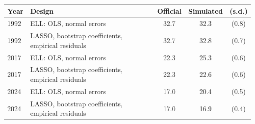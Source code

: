 \begin{tabular}{llccc}
\toprule
Year & Design & Official & Simulated & (s.d.) \\
\midrule
1992 & ELL: OLS, normal errors & 32.7 & 32.3 & (0.8) \\
1992 & LASSO, bootstrap coefficients, empirical residuals & 32.7 & 32.8 & (0.7) \\
2017 & ELL: OLS, normal errors & 22.3 & 25.3 & (0.6) \\
2017 & LASSO, bootstrap coefficients, empirical residuals & 22.3 & 22.6 & (0.6) \\
2024 & ELL: OLS, normal errors & 17.0 & 20.4 & (0.5) \\
2024 & LASSO, bootstrap coefficients, empirical residuals & 17.0 & 16.9 & (0.4) \\
\bottomrule
\end{tabular}
